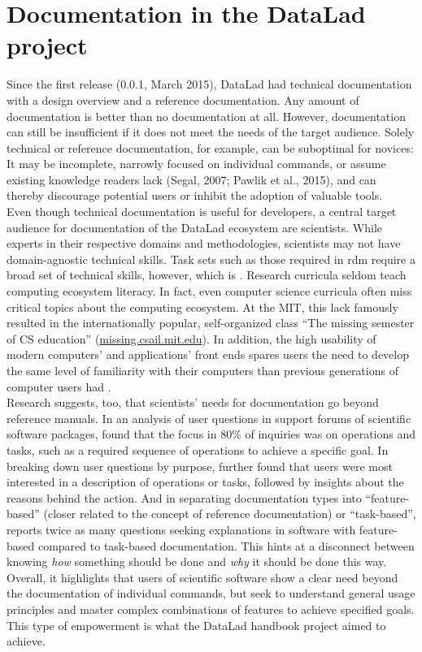 \section{Documentation in the DataLad project}

Since the first release (0.0.1, March 2015), DataLad had technical documentation with a design overview and a reference documentation.
Any amount of documentation is better than no documentation at all.
However, documentation can still be insufficient if it does not meet the needs of the target audience.
Solely technical or reference documentation, for example, can be suboptimal for novices: It may be incomplete, narrowly focused on individual commands, or assume existing knowledge readers lack (Segal, 2007; Pawlik et al., 2015), and can thereby discourage potential users or inhibit the adoption of valuable tools.\\
Even though technical documentation is useful for developers, a central target audience for documentation of the DataLad ecosystem are scientists.
While experts in their respective domains and methodologies, scientists may not have domain-agnostic technical skills.
Task sets such as those required in \gls{rdm} require a broad set of technical skills, however, which is \citep{grisham2016proposed}.
Research curricula seldom teach computing ecosystem literacy.
In fact, even computer science curricula often miss critical topics about the computing ecosystem.
At the \gls{MIT}, this lack famously resulted in the internationally popular, self-organized class ``The missing semester of CS education'' (\href{https://missing.csail.mit.edu/about/}{missing.csail.mit.edu}).
In addition, the high usability of modern computers' and applications' front ends spares users the need to develop the same level of familiarity with their computers than previous generations of computer users had \citep{mehlenbacher2003documentation}. \\
Research suggests, too, that scientists' needs for documentation go beyond reference manuals.
In an analysis of user questions in support forums of scientific software packages, \citet{swarts2019open} found that the focus in 80\% of inquiries was on operations and tasks, such as a required sequence of operations to achieve a specific goal.
In breaking down user questions by purpose, \citet{swarts2019open} further found that users were most interested in a description of operations or tasks, followed by insights about the reasons behind the action.
And in separating documentation types into ``feature-based'' (closer related to the concept of reference documentation) or ``task-based'',  \citet{swarts2019open} reports twice as many questions seeking explanations in software with feature-based compared to task-based documentation.
This hints at a disconnect between knowing \textit{how} something should be done and \textit{why} it should be done this way.
Overall, it highlights that users of scientific software show a clear need beyond the documentation of individual commands, but seek to understand general usage principles and master complex combinations of features to achieve specified goals.
This type of empowerment is what the DataLad handbook project aimed to achieve.


